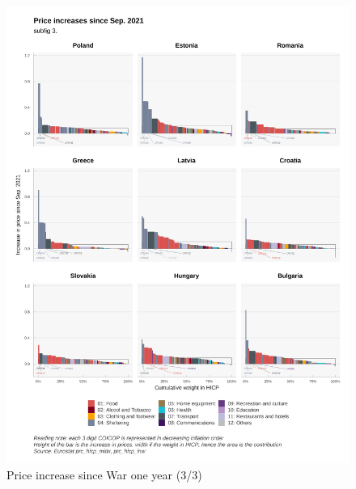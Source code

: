 \documentclass[
  9pt,
  a4paper,
  numbers=noendperiod,
  DIV=12]{scrartcl}
\begin{document}
\begin{figure}

\caption{Price increase since War one year (3/3)}

{\centering \includegraphics{svg/depuis_1y_3.png}

}

\end{figure}
\end{document}
